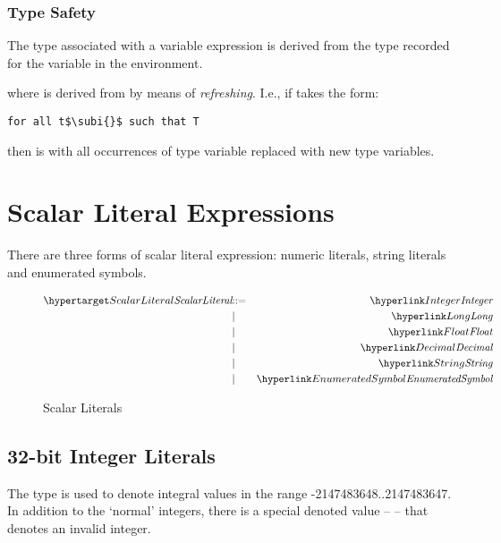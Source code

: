 \subsubsection{Type Safety}
The type associated with a variable expression is derived from the type recorded for the variable in the environment.
\begin{prooftree}
\end{prooftree}
where  is derived from  by means of \emph{refreshing}. I.e., if  takes the form:
\begin{lstlisting}[mathescape=true]
for all t$\subi{}$ such that T
\end{lstlisting}
then  is  with all occurrences of type variable  replaced with new type variables.


\section{Scalar Literal Expressions}
\label{scalarExpression}

There are three forms of scalar literal expression: numeric literals, string literals and enumerated symbols.

\begin{figure}[htbp]
\begin{eqnarray*}
\ntDef{ScalarLiteral}&\arrow&\ntRef{Integer}\\
&\choice&\ntRef{Long}\\
&\choice&\ntRef{Float}\\
&\choice&\ntRef{Decimal}\\
&\choice&\ntRef{String}\\
&\choice&\ntRef{EnumeratedSymbol}
\end{eqnarray*}
\caption{Scalar Literals}
\label{scalarExpressionFig}
\end{figure}

\subsection{32-bit Integer Literals}
\label{integerType}

The  type is used to denote integral values in the range -2147483648..2147483647. In addition to the `normal' integers, there is a special denoted value --  -- that denotes an invalid integer.

